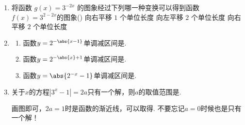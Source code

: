 \begin{enumerate}
    \item 将函数 $g(x)=3^{-2 x}$ 的图象经过下列哪一种变换可以得到函数 $f(x)=3^{2-2 x}$的图象\dotfill()
    {向右平移 $1$ 个单位长度}
    {向左平移 $2$ 个单位长度}
    {向右平移 $2$ 个单位长度}

    \item \begin{enumerate}
        \item 函数$y=2^{-\abs{x-1}}$单调减区间是\blkda{$[1,+\infty)$}.
        \item 函数$y=2^{-\abs{x}+1}$单调减区间是\blkda{$[0,+\infty)$}. 
        
        \item 函数$y=\abs{2^{-x}-1}$单调减区间是\blkda{$(-\infty, 0]$}. 
    \end{enumerate}

    
    \item 关于$x$的方程$|3^x-1| = 2a$只有一个解，则$a$的取值范围是\blkda[3]{$\left[\dfrac{1}{2}, +\infty\right) \cup \{0\}$}.
    \begin{jieda}
        画图即可，$2a = 1$时是函数的渐近线，可以取得. 不要忘记$a = 0$时候也是只有一个解！
    \end{jieda}
    

\end{enumerate}
